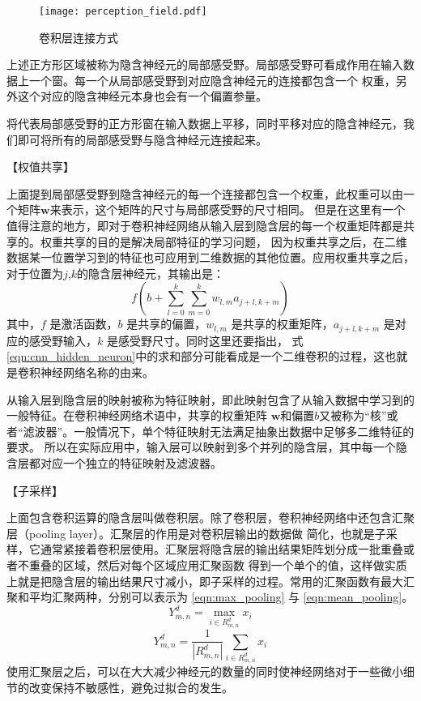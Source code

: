 \begin{figure}[htbp]
	\texttt{[image: perception\_field.pdf]}
	\caption{卷积层连接方式}
	\label{perception_filed}
\end{figure}

上述正方形区域被称为隐含神经元的局部感受野。局部感受野可看成作用在输入数据上一个窗。每一个从局部感受野到对应隐含神经元的连接都包含一个
权重，另外这个对应的隐含神经元本身也会有一个偏置参量。

将代表局部感受野的正方形窗在输入数据上平移，同时平移对应的隐含神经元，我们即可将所有的局部感受野与隐含神经元连接起来。

【权值共享】

上面提到局部感受野到隐含神经元的每一个连接都包含一个权重，此权重可以由一个矩阵$\mathbf{w}$来表示，这个矩阵的尺寸与局部感受野的尺寸相同。
但是在这里有一个值得注意的地方，即对于卷积神经网络从输入层到隐含层的每一个权重矩阵都是共享的。权重共享的目的是解决局部特征的学习问题，
因为权重共享之后，在二维数据某一位置学习到的特征也可应用到二维数据的其他位置。应用权重共享之后，对于位置为$j$,$k$的隐含层神经元，其输出是：
\begin{equation} 
\label{eqn:cnn_hidden_neuron}
f\left(b+\sum_{l=0}^{k} \sum_{m=0}^{k} w_{l, m} a_{j+l, k+m}\right)
\end{equation}
其中，$f$ 是激活函数，$b$ 是共享的偏置，$w_{l,m}$ 是共享的权重矩阵，$a_{j+l,k+m}$ 是对应的感受野输入，$k$ 是感受野尺寸。同时这里还要指出，
式\ref{eqn:cnn_hidden_neuron}中的求和部分可能看成是一个二维卷积的过程，这也就是卷积神经网络名称的由来。

从输入层到隐含层的映射被称为特征映射，即此映射包含了从输入数据中学习到的一般特征。在卷积神经网络术语中，共享的权重矩阵
$\mathbf{w}$和偏置$b$又被称为“核”或者“滤波器”。一般情况下，单个特征映射无法满足抽象出数据中足够多二维特征的要求。
所以在实际应用中，输入层可以映射到多个并列的隐含层，其中每一个隐含层都对应一个独立的特征映射及滤波器。

【子采样】

上面包含卷积运算的隐含层叫做卷积层。除了卷积层，卷积神经网络中还包含汇聚层（pooling layer）。汇聚层的作用是对卷积层输出的数据做
简化，也就是子采样，它通常紧接着卷积层使用。汇聚层将隐含层的输出结果矩阵划分成一批重叠或者不重叠的区域，然后对每个区域应用汇聚函数
得到一个单个的值，这样做实质上就是把隐含层的输出结果尺寸减小，即子采样的过程。常用的汇聚函数有最大汇聚和平均汇聚两种，分别可以表示为
\ref{eqn:max_pooling} 与 \ref{eqn:mean_pooling}。
\begin{equation}
\label{eqn:max_pooling} 
Y_{m, n}^{d}=\max _{i \in R_{m, n}^{d}} x_{i}
\end{equation}
\begin{equation} 
\label{eqn:mean_pooling}
Y_{m, n}^{d}=\frac{1}{\left|R_{m, n}^{d}\right|} \sum_{i \in R_{m, n}^{d}} x_{i}
\end{equation}
使用汇聚层之后，可以在大大减少神经元的数量的同时使神经网络对于一些微小细节的改变保持不敏感性，避免过拟合的发生。

